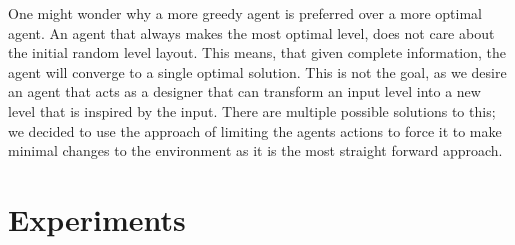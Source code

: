\documentclass[letterpaper]{article} %
\begin{document}
One might wonder why a more greedy agent is preferred over a more optimal agent. An agent that always makes the most optimal level, does not care about the initial random level layout. This means, that given complete information, the agent will converge to a single optimal solution. This is not the goal, as we desire an agent that acts as a designer that can transform an input level into a new level that is inspired by the input. There are multiple possible solutions to this; we decided to use the approach of limiting the agents actions to force it to make minimal changes to the environment as it is the most straight forward approach.


\section{Experiments}
\end{document}
